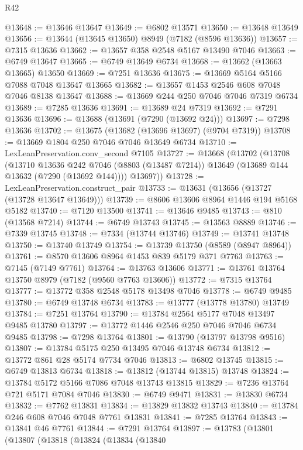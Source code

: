 \begin{lexlean}{R42}
\begin{coremodule}
{@13648 := @13646 @13647
@13649 := @6802 @13571
@13650 := @13648 @13649
@13656 := @13644 (@13645 @13650) @8949 (@7182 (@8596 @13636))
@13657 := @7315 @13636
@13662 := @13657 @358 @2548 @5167 @13490 @7046
@13663 := @6749 @13647
@13665 := @6749 @13649 @6734
@13668 := @13662 (@13663 @13665) @13650
@13669 := @7251 @13636
@13675 := @13669 @5164 @5166 @7088 @7048 @13647 @13665
@13682 := @13657 @1453 @2546 @608 @7048 @7046 @8138 @13647
@13688 := @13669 @244 @250 @7046 @7046 @7319 @6734
@13689 := @7285 @13636
@13691 := @13689 @24 @7319
@13692 := @7291 @13636
@13696 := @13688 (@13691 (@7290 (@13692 @24)))
@13697 := @7298 @13636
@13702 := @13675 (@13682 (@13696 @13697) (@9704 @7319))
@13708 := @13669 @1804 @250 @7046 @7046 @13649 @6734
@13710 := LexLeanPreservation.conv_second @7105
@13727 := @13668
    (@13702
      (@13708
        (@13710
          @13636
          @242
          @7046
          (@8803 (@13487 @7214))
          @13649
          (@13689 @144 @13632 (@7290 (@13692 @144))))
        @13697))
@13728 := LexLeanPreservation.construct_pair
@13733 := @13631 (@13656 (@13727 (@13728 @13647 @13649)))
@13739 := @8606 @13606 @8964 @1446 @194 @5168 @5182
@13740 := @7120 @13500
@13741 := @13646 @9485
@13743 := @810 (@13568 @7214)
@13744 := @6749 @13743
@13745 := @13563 @8889
@13746 := @7339 @13745
@13748 := @7334 (@13744 @13746)
@13749 := @13741 @13748
@13750 := @13740 @13749
@13754 := @13739 @13750 (@8589 (@8947 @8964))
@13761 := @8570 @13606 @8964 @1453 @839 @5179 @371 @7763
@13763 := @7145 (@7149 @7761)
@13764 := @13763 @13606
@13771 := @13761 @13764 @13750 @8979 (@7182 (@9560 @7763 @13606))
@13772 := @7315 @13764
@13777 := @13772 @358 @2548 @5178 @13498 @7046
@13778 := @6749 @9485
@13780 := @6749 @13748 @6734
@13783 := @13777 (@13778 @13780) @13749
@13784 := @7251 @13764
@13790 := @13784 @2564 @5177 @7048 @13497 @9485 @13780
@13797 := @13772 @1446 @2546 @250 @7046 @7046 @6734 @9485
@13798 := @7298 @13764
@13801 := @13790 (@13797 @13798 @9516)
@13807 := @13784 @5175 @250 @13495 @7046 @13748 @6734
@13812 := @13772 @861 @28 @5174 @7734 @7046
@13813 := @6802 @13745
@13815 := @6749 @13813 @6734
@13818 := @13812 (@13744 @13815) @13748
@13824 := @13784 @5172 @5166 @7086 @7048 @13743 @13815
@13829 := @7236 @13764 @721 @5171 @7084 @7046
@13830 := @6749 @9471
@13831 := @13830 @6734
@13832 := @7762 @13831
@13834 := @13829 @13832 @13743
@13840 := @13784 @246 @608 @7046 @7048 @7761 @13831
@13841 := @7285 @13764
@13843 := @13841 @46 @7761
@13844 := @7291 @13764
@13897 := @13783
    (@13801
      (@13807
        (@13818
          (@13824
            (@13834
              (@13840
}
\end{coremodule}
\end{lexlean}
